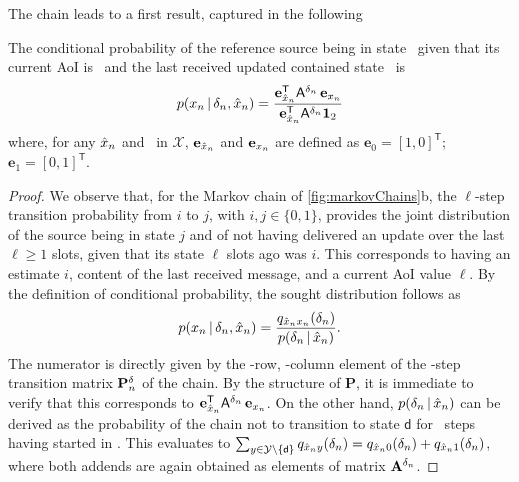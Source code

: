 The chain leads to a first result, captured in the following
\begin{prop} \label{prop1}The conditional probability of the reference source being in state \mcn\ given that its current AoI is \agen\ and the last received updated contained state \estn\ is 
    \begin{align}
        p(x_n\, | \,\delta_n,\hat{x}_n) = \frac{ \mathbf e_{\hat{x}_n}^{\mathsf T} \mathsf A^{\delta_n} \,\mathbf e_{x_n}}{\mathbf e_{\hat{x}_n}^{\mathsf T} \mathsf A^{\delta_n} \mathbf 1_2}
        \label{eq:pmfXnGivenDeltaXnHat}
    \end{align}
    where, for any $\hat{x}_n$ and \mcn\ in  $\mathcal X$, $\mathbf e_{\hat{x}_n}$ and $\mathbf e_{x_n}$ are defined as \mbox{$\mathbf e_0 = [1,0]^{\mathsf T}$}; $\mathbf e_1 = [0,1]^{\mathsf T}$.
\end{prop}
\begin{proof}
We observe that, for the Markov chain of \figr\ref{fig:markovChains}b, the $\ell$-step transition probability from $i$ to $j$, with $i,j \in \{0,1\}$, provides the joint distribution of the source being in state $j$ and of not having delivered an update over the last $\ell \geq 1$ slots, given that its state $\ell$ slots ago was $i$. This corresponds to having an estimate $i$, content of the last received message, and a current AoI value $\ell$. By the definition of conditional probability, the sought distribution follows as
\begin{align}
    p(x_n\, | \,\delta_n,\hat{x}_n) = \frac{q_{\hat{x}_n x_n}(\delta_n)}{p(\delta_n\, | \,\hat{x}_n)}.
\end{align}
The numerator is directly given by the \estn-row, \mcn-column element of the \agen-step transition matrix $\mathbf P^\agen$ of the chain. By the structure of $\mathbf P$, it is immediate to verify that this corresponds to $\mathbf e_{\hat{x}_n}^{\mathsf T} \mathsf A^{\delta_n} \,\mathbf e_{x_n}$. On the other hand, %
$p(\delta_n\, | \,\hat{x}_n)$ can be derived as the probability of the chain not to transition to state $\mathsf d$ for \agen\ steps having started in \estn. This evaluates to $\sum\nolimits_{y\in\mathcal Y\setminus\{\mathsf d\}} q_{\hat{x}_n y}(\delta_n) = q_{\hat{x}_n 0}(\delta_n)  + q_{\hat{x}_n 1}(\delta_n)$, where both addends are again obtained as elements of matrix $\mathbf A^{\delta_n}$.
\end{proof}
